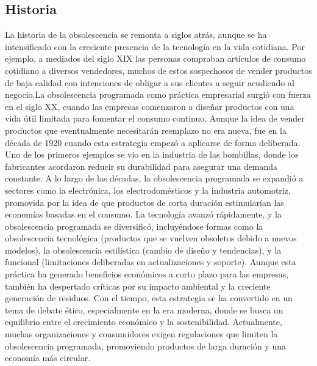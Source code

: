 \documentclass[10pt,journal,compsoc]{IEEEtran}
\begin{document}
\subsection{Historia}
La historia de la obsolescencia se remonta a siglos atrás, aunque se ha intensificado con la creciente presencia de la tecnología en la vida cotidiana. Por ejemplo, a mediados del siglo XIX las personas compraban artículos de consumo cotidiano a diversos vendedores, muchos de estos sospechosos de vender productos de baja calidad con intenciones de obligar a sus clientes a seguir acudiendo al negocio\cite{maycroft2009consumption}.La obsolescencia programada como práctica empresarial surgió con fuerza en el siglo XX, cuando las empresas comenzaron a diseñar productos con una vida útil limitada para fomentar el consumo continuo. Aunque la idea de vender productos que eventualmente necesitarán reemplazo no era nueva, fue en la década de 1920 cuando esta estrategia empezó a aplicarse de forma deliberada. Uno de los primeros ejemplos se vio en la industria de las bombillas, donde los fabricantes acordaron reducir su durabilidad para asegurar una demanda constante. A lo largo de las décadas, la obsolescencia programada se expandió a sectores como la electrónica, los electrodomésticos y la industria automotriz, promovida por la idea de que productos de corta duración estimularían las economías basadas en el consumo.
La tecnología avanzó rápidamente, y la obsolescencia programada se diversificó, incluyéndose formas como la obsolescencia tecnológica (productos que se vuelven obsoletos debido a nuevos modelos), la obsolescencia estilística (cambio de diseño y tendencias), y la funcional (limitaciones deliberadas en actualizaciones y soporte)\cite{maycroft2009consumption}. Aunque esta práctica ha generado beneficios económicos a corto plazo para las empresas, también ha despertado críticas por su impacto ambiental y la creciente generación de residuos. Con el tiempo, esta estrategia se ha convertido en un tema de debate ético, especialmente en la era moderna, donde se busca un equilibrio entre el crecimiento económico y la sostenibilidad. Actualmente, muchas organizaciones y consumidores exigen regulaciones que limiten la obsolescencia programada, promoviendo productos de larga duración y una economía más circular.

\end{document}
